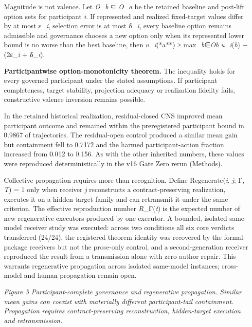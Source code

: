 Magnitude is not valence. Let \emph{O\_b} ⊆ \emph{O\_a} be the retained
baseline and post-lift option sets for participant \emph{i}. If
represented and realized fixed-target values differ by at most
ε\_\emph{i}, selection error is at most δ\_\emph{i}, every baseline
option remains admissible and governance chooses a new option only when
its represented lower bound is no worse than the best baseline, then
\emph{u\_i}(*a**) ≥ max\_\emph{b}∈\emph{Ob} \emph{u\_i}(\emph{b}) −
(2ε\_\emph{i} + δ\_\emph{i}).

\textbf{Participantwise option-monotonicity theorem.} The inequality
holds for every governed participant under the stated assumptions. If
participant completeness, target stability, projection adequacy or
realization fidelity fails, constructive valence inversion remains
possible.

In the retained historical realization, residual-closed CNS improved
mean participant outcome and remained within the preregistered
participant bound in 0.9867 of trajectories. The residual-open control
produced a similar mean gain but containment fell to 0.7172 and the
harmed participant-action fraction increased from 0.012 to 0.156. As
with the other inherited numbers, these values were reproduced
deterministically in the v16 Gate Zero rerun (Methods).

Collective propagation requires more than recognition. Define
Regenerate(\emph{i}, \emph{j}; Γ, \emph{T}) = 1 only when receiver
\emph{j} reconstructs a contract-preserving realization, executes it on
a hidden target family and can retransmit it under the same criterion.
The effective reproduction number \emph{R}\_Γ(\emph{t}) is the expected
number of new regenerative executors produced by one executor. A
bounded, isolated same-model receiver study was executed: across two
conditions all six core verdicts transferred (24/24), the registered
theorem identity was recovered by the formal-package receivers but not
the prose-only control, and a second-generation receiver reproduced the
result from a transmission alone with zero author repair. This warrants
regenerative propagation across isolated same-model instances;
cross-model and human propagation remain open.

\emph{Figure 5 \textbar{} Participant-complete governance and
regenerative propagation. Similar mean gains can coexist with materially
different participant-tail containment. Propagation requires
contract-preserving reconstruction, hidden-target execution and
retransmission.}

